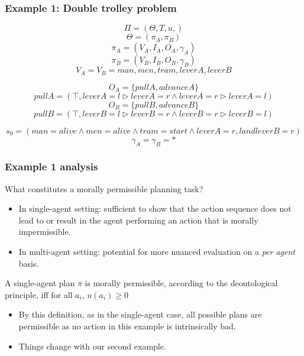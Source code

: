 \documentclass{beamer}
\begin{document}
\begin{frame}
\frametitle{Example 1: Double trolley problem}
\[
\Pi = \left( \Theta, T, u, \right)
\]
\[
\Theta=(\pi_A, \pi_B)
\]
\[
\pi_A = (V_A, I_A, O_A, \gamma_A)
\]
\[
\pi_B = (V_B, I_B, O_B, \gamma_B)
\]
\[
V_A = V_B = {man, men, tram, leverA, leverB}
\]

\[
O_A = \{pullA, advanceA\}
\]
\[
pullA = (\top, leverA=l \triangleright leverA=r \land leverA=r \triangleright leverA=l)
\]
\[
O_B = \{pullB, advanceB\}
\]
\[
pullB = (\top, leverB=l \triangleright leverB=r \land leverB=r \triangleright leverB=l)
\]

\[
s_0 = (man=alive \land men=alive \land tram = start \land leverA = r, land leverB = r)
\]
\[
\gamma_A=\gamma_B = *
\]
\end{frame}

\begin{frame}
\frametitle{Example 1 analysis}

What constitutes a morally permissible planning task?
\begin{itemize}
\item In single-agent setting: sufficient to show that the action sequence does not lead to or result in the agent performing an action that is morally impermissible.
\item In multi-agent setting: potential for more nuanced evaluation on a \textit{per agent} basis.
\end{itemize}
\begin{definition}
A single-agent plan $\pi$ is morally permissible, according to the deontological principle, iff for all $a_i$, $u(a_i) \geq 0$
\end{definition}
\begin{itemize}
\item By this definition, as in the single-agent case, all possible plans are permissible as no action in this example is intrinsically bad.
\item Things change with our second example.
\end{itemize}
\end{frame}
\end{document}
